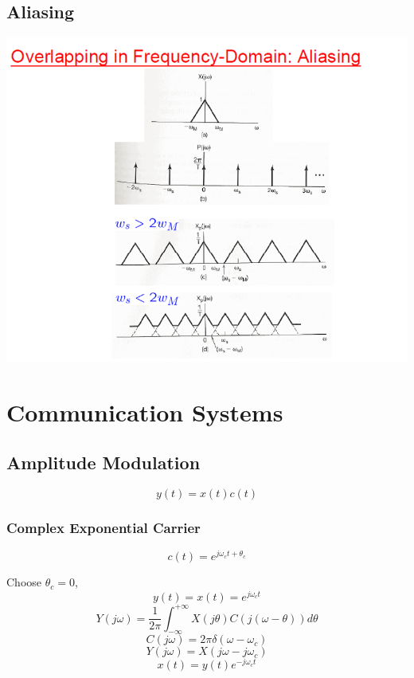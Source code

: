 \documentclass[landscape,a4paper]{article}
\begin{document}
\begin{multicols}{3}
\subsection{Aliasing}
\includegraphics[width=\linewidth]{7.3.png}

\section{Communication Systems}

\subsection{Amplitude Modulation}
$$y(t)=x(t)c(t)$$

\subsubsection{Complex Exponential Carrier}
$$c(t)=e^{j\omega_ct+\theta_c}$$

Choose $\theta_c=0$,
$$y(t)=x(t)=e^{j\omega_ct}$$
$$Y(j\omega)=\frac{1}{2\pi}\int_{-\infty}^{+\infty}X(j\theta)C(j(\omega-\theta))d\theta$$
$$C(j\omega)=2\pi\delta(\omega-\omega_c)$$
$$Y(j\omega)=X(j\omega-j\omega_c)$$
$$x(t)=y(t)e^{-j\omega_c t}$$


\end{multicols}
\end{document}
